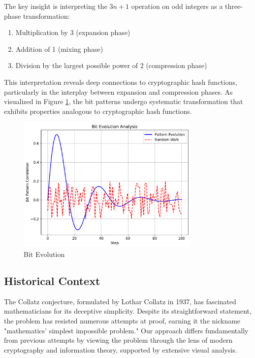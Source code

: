 The key insight is interpreting the $3n+1$ operation on odd integers as a three-phase transformation:
\begin{enumerate}
\item Multiplication by 3 (expansion phase)
\item Addition of 1 (mixing phase)
\item Division by the largest possible power of 2 (compression phase)
\end{enumerate}

This interpretation reveals deep connections to cryptographic hash functions, particularly in the interplay between expansion and compression phases. As visualized in Figure \ref{fig:bit_evolution_intro}, the bit patterns undergo systematic transformation that exhibits properties analogous to cryptographic hash functions.

\begin{figure}[h]
\centering
\includegraphics[width=0.8\textwidth]{py_visuals/figures/bit_evolution.pdf}
\caption{Bit Evolution}
\label{fig:bit_evolution_intro}
\end{figure}

\subsection{Historical Context}
The Collatz conjecture, formulated by Lothar Collatz in 1937, has fascinated mathematicians for its deceptive simplicity. Despite its straightforward statement, the problem has resisted numerous attempts at proof, earning it the nickname "mathematics' simplest impossible problem." Our approach differs fundamentally from previous attempts by viewing the problem through the lens of modern cryptography and information theory, supported by extensive visual analysis.

